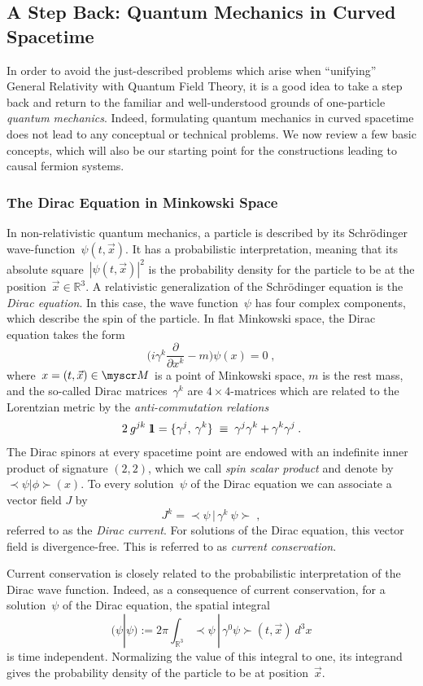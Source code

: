 \documentclass[reqno,11pt]{amsart}
\numberwithin{equation}{section}
\newcommand{\beq}{\begin{equation}}
\newcommand{\eeq}{\end{equation}}
\newcommand{\Sl}{\mathopen{\prec}}
\newcommand{\Sr}{\mathclose{\succ}}
\newcommand{\R}{\mathbb{R}}
\newcommand{\1}{\mbox{\rm 1 \hspace{-1.05 em} 1}}
\newcommand{\scrM}{\myscr M}
\begin{document}
\subsection{A Step Back: Quantum Mechanics in Curved Spacetime} \label{secQMcurved}
In order to avoid the just-described problems which arise when ``unifying''
General Relativity with Quantum Field Theory, it is a good idea to
take a step back and
return to the familiar and well-understood grounds of one-particle {\em{quantum mechanics}}.
Indeed, formulating quantum mechanics in curved spacetime does not lead to any
conceptual or technical problems. We now review a few basic concepts,
which will also be our starting point for the constructions leading to causal fermion systems.

\subsubsection{The Dirac Equation in Minkowski Space}
In non-relativistic quantum mechanics, a particle is described
by its Schr\"odinger wave-function~$\psi(t,\vec{x})$.
It has a probabilistic interpretation, meaning that its
absolute square~$|\psi(t,\vec{x})|^2$ is the probability density for the particle to be at the position~$\vec{x} \in \R^3$.
A relativistic generalization of the Schr\"odinger equation is the {\em{Dirac equation}}.
In this case, the wave function~$\psi$ has four complex components, which describe the spin of the particle.
In flat Minkowski space, the Dirac equation takes the form
\beq
    \Big( i \gamma^k \frac{\partial}{\partial x^k} - m \Big)
    \psi(x) = 0 \;, \label{Dirac1}
\eeq
where~$x=(t,\vec{x}) \in \scrM$ is a point of Minkowski space, $m$ is the rest mass,
and the so-called Dirac matrices~$\gamma^k$ are $4 \times 4$-matrices which are 
related to the Lorentzian metric by the {\em{anti-commutation relations}}
\[ %
2\: g^{jk}\:\1 = \{ \gamma^j,\: \gamma^k\} \;\equiv\; \gamma^j \gamma^k +
\gamma^k \gamma^j \:. %
\]
The Dirac spinors at every spacetime point are
endowed with an indefinite inner product of signature $(2,2)$, which we call
{\em{spin scalar product}} and denote by~$\Sl \psi | \phi \Sr(x)$.
To every solution~$\psi$ of the Dirac equation
we can associate a vector field $J$ by
\[ %
J^k = \Sl \psi \,|\, \gamma^k\: \psi \Sr \;, \]
referred to as the {\em{Dirac current}}.
For solutions of the Dirac equation, this vector field is divergence-free.
This is referred to as {\em{current conservation}}.

Current conservation is closely related to the probabilistic interpretation of
the Dirac wave function. Indeed, as a consequence of current conservation,
for a solution~$\psi$ of the Dirac equation, the spatial integral
\[ %
( \psi | \psi ) := 2 \pi \int_{\R^3} \Sl \psi \,|\, \gamma^0 \psi
\Sr(t, \vec{x}) \:d^3x %
\]
is time independent. Normalizing the value of this integral to one, its integrand
gives the probability density of the particle to be at position~$\vec{x}$.
\end{document}
